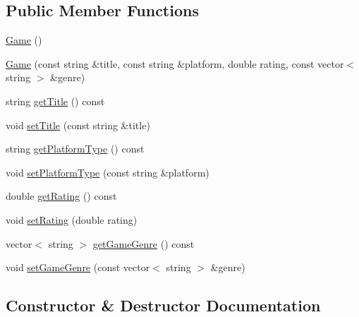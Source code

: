 \subsection*{Public Member Functions}
\begin{DoxyCompactItemize}
\item 
\hyperlink{classbridges_1_1dataset_1_1_game_a69c089990808d1466b97ced4dd480c28}{Game} ()
\item 
\hyperlink{classbridges_1_1dataset_1_1_game_a09fd0fc1cf743bf5f21e1443ec06a675}{Game} (const string \&title, const string \&platform, double rating, const vector$<$ string $>$ \&genre)
\item 
string \hyperlink{classbridges_1_1dataset_1_1_game_a5a58695599b120677ebf6631b8c66d68}{get\+Title} () const
\item 
void \hyperlink{classbridges_1_1dataset_1_1_game_a8f8f6e03458c05e20b0b446f9ddd211a}{set\+Title} (const string \&title)
\item 
string \hyperlink{classbridges_1_1dataset_1_1_game_ab3e2c8d319e7ef0b72d20c2d7153d35b}{get\+Platform\+Type} () const
\item 
void \hyperlink{classbridges_1_1dataset_1_1_game_a4a37e5db557c7d4cde50ac33fbee1a34}{set\+Platform\+Type} (const string \&platform)
\item 
double \hyperlink{classbridges_1_1dataset_1_1_game_aaada99b6ee03515d543fd8717fab592c}{get\+Rating} () const
\item 
void \hyperlink{classbridges_1_1dataset_1_1_game_a95038f714770bb2e12aeed91614264db}{set\+Rating} (double rating)
\item 
vector$<$ string $>$ \hyperlink{classbridges_1_1dataset_1_1_game_a2ef20a6fc43d2475cf48befe9f3bf0e6}{get\+Game\+Genre} () const
\item 
void \hyperlink{classbridges_1_1dataset_1_1_game_a83030f4b359bc194bff103e6da5c7fd9}{set\+Game\+Genre} (const vector$<$ string $>$ \&genre)
\end{DoxyCompactItemize}


\subsection{Constructor \& Destructor Documentation}
\mbox{\label{classbridges_1_1dataset_1_1_game_a69c089990808d1466b97ced4dd480c28}} 
